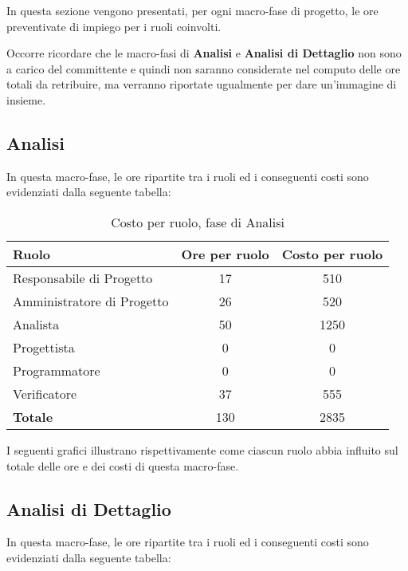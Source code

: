 In questa sezione vengono presentati, per ogni macro-fase di progetto, le ore preventivate di impiego per i ruoli coinvolti.

\noindent Occorre ricordare che le macro-fasi di \textbf{Analisi} e \textbf{Analisi di Dettaglio} non sono a carico del committente e quindi non saranno considerate nel computo delle ore totali da retribuire, ma verranno riportate ugualmente per dare un'immagine di insieme.

\subsection{Analisi}
In questa macro-fase, le ore ripartite tra i ruoli ed i conseguenti costi sono evidenziati dalla seguente tabella:

\begin{table}[h]
	\centering
	\begin{tabular}{|l|c|c|}
		\toprule
		\textbf{Ruolo} & \textbf{Ore per ruolo} & \textbf{Costo per ruolo} \\
				
		\midrule
		Responsabile di Progetto & 17 & 510 \\
		Amministratore di Progetto & 26 & 520 \\ 
		Analista & 50 & 1250 \\
		Progettista & 0 & 0 \\
		Programmatore & 0 & 0 \\
		Verificatore & 37 & 555 \\
		\midrule
		\textbf{Totale} & 130 & 2835 \\
				
		\bottomrule
	\end{tabular}
	\caption{Costo per ruolo, fase di Analisi}
\end{table}

I seguenti grafici illustrano rispettivamente come ciascun ruolo abbia influito sul totale delle ore e dei costi di questa macro-fase.

\subsection{Analisi di Dettaglio}
In questa macro-fase, le ore ripartite tra i ruoli ed i conseguenti costi sono evidenziati dalla seguente tabella:

